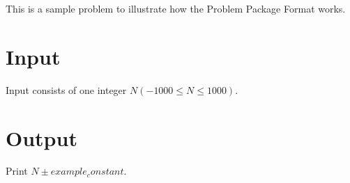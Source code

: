 This is a sample problem to illustrate how the Problem Package Format works.
\section*{Input}
Input consists of one integer $N (-1000 \le N \le 1000)$.
\section*{Output}
Print $N \pm {{example_constant}}$.
